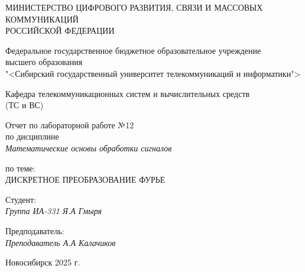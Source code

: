 \thispagestyle{empty}

\begin{center}
    МИНИСТЕРСТВО ЦИФРОВОГО РАЗВИТИЯ, СВЯЗИ И МАССОВЫХ КОММУНИКАЦИЙ \\ РОССИЙСКОЙ ФЕДЕРАЦИИ

    \vspace{20pt}

    Федеральное государственное бюджетное образовательное учреждение  \\  высшего образования \\
    "<Сибирский государственный университет телекоммуникаций и информатики"> \\

    \vspace{20pt}

    Кафедра телекоммуникационных систем и вычислительных средств \\  (ТС и ВС)
\end{center}

\vfill

\begin{center}
    Отчет по лабораторной работе №12 \\  
    по дисциплине \\
    \textit{Математические основы обработки сигналов}

    \vspace{20pt}

    по теме: \\
    \uppercase{Дискретное преобразование Фурье}
\end{center}

\vfill

    \noindent Студент: \\
    \textit{Группа ИА-331 \hfill Я.А Гмыря}

    \vspace{20pt}

    \noindent Предподаватель: \\
    \textit{Преподаватель \hfill А.А Калачиков}

\vfill

\begin{center}
    Новосибирск 2025 г.
\end{center}